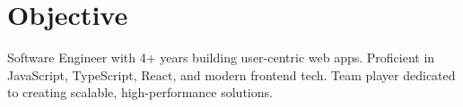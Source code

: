 \documentclass[]{deedy-resume-reversed}
\begin{document}
%
%

%
%

%
%

\begin{minipage}[t]{0.60\textwidth}


\section{Objective}
Software Engineer with 4+ years building user-centric web apps. Proficient in JavaScript, TypeScript, React, and modern frontend tech. Team player dedicated to creating scalable, high-performance solutions.
\sectionsep



\end{minipage}
\end{document}
